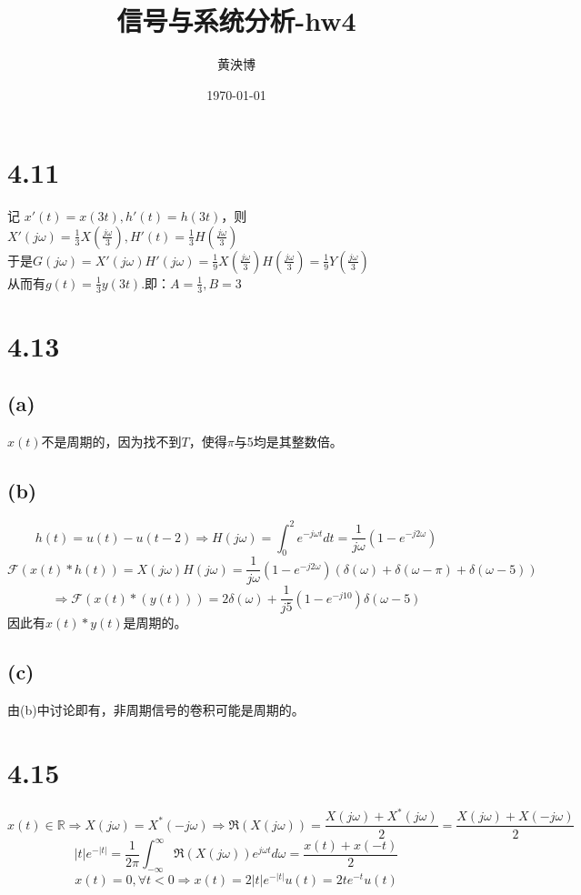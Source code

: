 \documentclass[UTF8,fontset=fandol,12pt,a4paper]{ctexart}
\title{信号与系统分析-hw4}
\author{黄泱博\quad2024012867}
\date{\today}
\begin{document}
\maketitle

\section*{4.11}
\noindent 记 $x'(t)=x(3t),h'(t)=h(3t)$，则$X'(j\omega)=\frac{1}{3}X(\frac{j\omega}{3}),H'(t)=\frac{1}{3}H(\frac{j\omega}{3})$\\
于是$G(j\omega)=X'(j\omega)H'(j\omega)=\frac{1}{9}X(\frac{j\omega}{3})H(\frac{j\omega}{3})=\frac{1}{9}Y(\frac{j\omega}{3})$\\
从而有$g(t)=\frac{1}{3}y(3t)$.即：$A=\frac{1}{3},B=3$

\section*{4.13}
\subsection*{(a)}
$x(t)$不是周期的，因为找不到$T$，使得$\pi$与5均是其整数倍。
\subsection*{(b)}
\[h(t)=u(t)-u(t-2) \Rightarrow H(j\omega)=\int_{0}^{2}e^{-j\omega t}dt=\frac{1}{j\omega}(1-e^{-j2\omega})\]
\[\mathcal{F}(x(t)*h(t))=X(j\omega)H(j\omega)=\frac{1}{j\omega}(1-e^{-j2\omega})(\delta(\omega)+\delta(\omega-\pi)+\delta(\omega-5))\]
\[\Longrightarrow\mathcal{F}(x(t)*(y(t)))=2\delta(\omega)+\frac{1}{j5}(1-e^{-j10})\delta(\omega-5)\]
因此有$x(t)*y(t)$是周期的。
\subsection*{(c)}
由(b)中讨论即有，非周期信号的卷积可能是周期的。

\section*{4.15}
\[x(t)\in\mathbb{R}\Rightarrow X(j\omega)=X^*(-j\omega)\Rightarrow \mathfrak{R}(X(j\omega))=\frac{X(j\omega)+X^*(j\omega)}{2}=\frac{X(j\omega)+X(-j\omega)}{2}\]
\[|t|e^{-|t|}=\frac{1}{2\pi}\int_{-\infty}^{\infty}\mathfrak{R}(X(j\omega))e^{j\omega t}d\omega=\frac{x(t)+x(-t)}{2}\]
\[x(t)=0,\forall t<0\Rightarrow x(t)=2|t|e^{-|t|}u(t)=2te^{-t}u(t)\]
\end{document}
